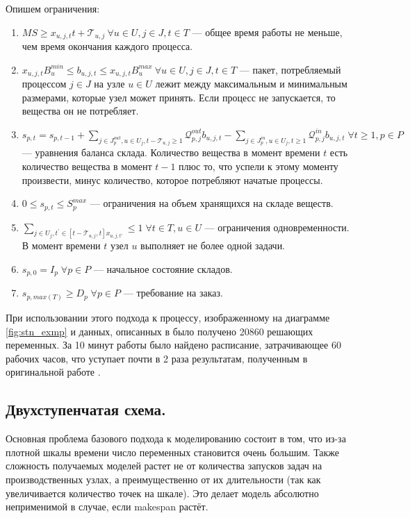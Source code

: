\documentclass[12pt, twoside]{article}
\theoremstyle{definition}
\newcommand{\Tau}{\mathcal{T}}
\begin{document}
Опишем ограничения:

\begin{enumerate}
	\item $MS \geq x_{u, j, t}t + \Tau_{u, j} \: \forall u \in U, j \in J, t \in T$ --- общее время работы не меньше, чем время окончания каждого процесса.
	\item $x_{u, j, t}B^{min}_u \leq b_{u, j, t} \leq x_{u, j, t}B^{max}_u \: \forall u \in U, j \in J, t \in T$ --- пакет, потребляемый процессом $j \in J$ на узле $u \in U$ лежит между максимальным и минимальным размерами, которые узел может принять. Если процесс не запускается, то вещества он не потребляет.
	\item $s_{p, t} = s_{p, t-1} + \displaystyle\sum_{j \in J^{out}_p, u \in U_j, t - \Tau_{u, j} \geq 1} \mathcal{Q}^{out}_{p, j}b_{u, j, t} - \displaystyle\sum_{j \in J^{in}_p, u \in U_j, t \geq 1} \mathcal{Q}^{in}_{p, j}b_{u, j, t} \; \forall t \geq 1, p \in P$ --- уравнения баланса склада. Количество вещества в момент времени $t$ есть количество вещества в момент $t-1$ плюс то, что успели к этому моменту произвести, минус количество, которое потребляют начатые процессы.
	\item $0 \leq s_{p, t} \leq S^{max}_p$ --- ограничения на объем хранящихся на складе веществ.
	\item $\displaystyle\sum_{j \in U_j, t^{'} \in [t-\Tau_{u, j}, t] x_{u, j, t'}} \leq 1 \; \forall t \in T, u \in U$ --- ограничения одновременности. В момент времени $t$ узел $u$ выполняет не более одной задачи.
	\item $s_{p, 0} = I_p \; \forall p \in P$ --- начальное состояние складов.
	\item $s_{p, max(T)} \geq D_p \; \forall p \in P$ --- требование на заказ.
\end{enumerate}

При использовании этого подхода к процессу, изображенному на диаграмме \ref{fig:stn_exmp} и данных, описанных в \cite{discretetime} было получено 20860 решающих переменных. За 10 минут работы было найдено расписание, затрачивающее 60 рабочих часов, что уступает почти в 2 раза результатам, полученным в оригинальной работе \cite{discretetime}.

\subsection{Двухступенчатая схема.}

Основная проблема базового подхода к моделированию состоит в том, что из-за плотной шкалы времени число переменных становится очень большим. Также сложность получаемых моделей растет не от количества запусков задач на производственных узлах, а преимущественно от их длительности (так как увеличивается количество точек на шкале). Это делает модель абсолютно неприменимой в случае, если makespan растёт.
\end{document}
